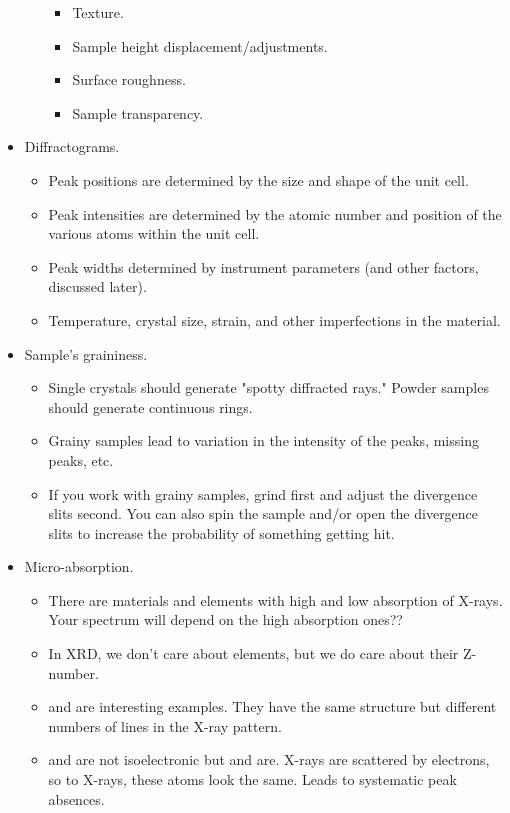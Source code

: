 \documentclass[../notes.tex]{subfiles}
\begin{document}
\begin{itemize}
\begin{itemize}
\begin{itemize}
            \item Texture.
            \item Sample height displacement/adjustments.
            \item Surface roughness.
            \item Sample transparency.
        \end{itemize}
    \end{itemize}
    \item Diffractograms.
    \begin{itemize}
        \item Peak positions are determined by the size and shape of the unit cell.
        \item Peak intensities are determined by the atomic number and position of the various atoms within the unit cell.
        \item Peak widths determined by instrument parameters (and other factors, discussed later).
        \item Temperature, crystal size, strain, and other imperfections in the material.
    \end{itemize}
    \item Sample's graininess.
    \begin{itemize}
        \item Single crystals should generate "spotty diffracted rays." Powder samples should generate continuous rings.
        \item Grainy samples lead to variation in the intensity of the peaks, missing peaks, etc.
        \item If you work with grainy samples, grind first and adjust the divergence slits second. You can also spin the sample and/or open the divergence slits to increase the probability of something getting hit.
    \end{itemize}
    \item Micro-absorption.
    \begin{itemize}
        \item There are materials and elements with high and low absorption of X-rays. Your spectrum will depend on the high absorption ones??
        \item In XRD, we don't care about elements, but we do care about their Z-number.
        \item {} and  are interesting examples. They have the same structure but different numbers of lines in the X-ray pattern.
        \item {} and  are not isoelectronic but  and  are. X-rays are scattered by electrons, so to X-rays, these atoms look the same. Leads to systematic peak absences.

\end{itemize}
\end{itemize}
\end{document}
